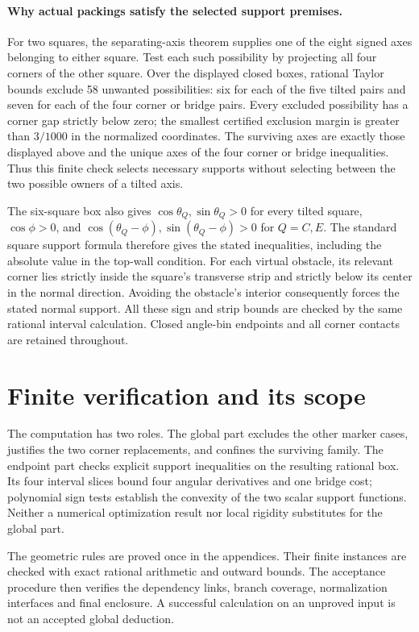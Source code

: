 \documentclass[11pt]{article}
\begin{document}
\paragraph{Why actual packings satisfy the selected support premises.}
For two squares, the separating-axis theorem supplies one of the eight
signed axes belonging to either square.  Test each such possibility by
projecting all four corners of the other square.  Over the displayed
closed boxes, rational Taylor bounds exclude 58 unwanted possibilities:
six for each of the five tilted pairs and seven for each of the four
corner or bridge pairs.  Every excluded possibility has a corner gap
strictly below zero; the smallest certified exclusion margin is greater
than $3/1000$ in the normalized coordinates.  The surviving axes are
exactly those displayed above and the unique axes of the four corner or
bridge inequalities.  Thus this finite check selects necessary supports
without selecting between the two possible owners of a tilted axis.

The six-square box also gives $\cos\theta_Q,\sin\theta_Q>0$ for every tilted
square, $\cos\phi>0$, and
$\cos(\theta_Q-\phi),\sin(\theta_Q-\phi)>0$ for $Q=C,E$.
The standard square support formula therefore gives the stated
inequalities, including the absolute value in the top-wall condition.
For each virtual obstacle, its relevant corner lies strictly inside the
square's transverse strip and strictly below its center in the normal
direction.  Avoiding the obstacle's interior consequently forces the
stated normal support.  All these sign and strip bounds are checked by
the same rational interval calculation.  Closed angle-bin endpoints and
all corner contacts are retained throughout.



\section{Finite verification and its scope}\label{sec:verification}
The computation has two roles. The global part excludes the other marker
cases, justifies the two corner replacements, and confines the surviving
family. The endpoint part checks explicit support inequalities on the
resulting rational box. Its four interval slices bound four angular
derivatives and one bridge cost; polynomial sign tests establish the
convexity of the two scalar support functions. Neither a numerical
optimization result nor local rigidity substitutes for the global part.

The geometric rules are proved once in the appendices. Their finite
instances are checked with exact rational arithmetic and outward bounds.
The acceptance procedure then verifies the dependency links, branch
coverage, normalization interfaces and final enclosure. A successful
calculation on an unproved input is not an accepted global deduction.
\end{document}
